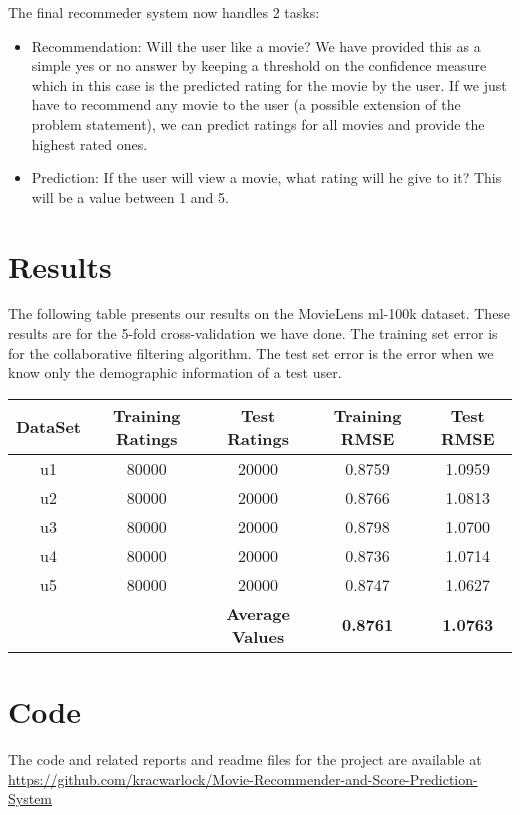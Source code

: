 \documentclass[pdftex,12pt,a4paper]{article}
\begin{document}
		The final recommeder system now handles 2 tasks:
		\begin{itemize}
			\item Recommendation: Will the user like a movie? We have provided this as a simple yes or no answer by keeping a threshold on the confidence measure which in this case is the predicted rating for the movie by the user. If we just have to recommend any movie to the user (a possible extension of the problem statement), we can predict ratings for all movies and provide the highest rated ones.
			\item Prediction: If the user will view a movie, what rating will he give to it? This will be a value between 1 and 5.
		\end{itemize}

	\section{Results}
		The following table presents our results on the MovieLens ml-100k dataset. These results are for the 5-fold cross-validation we have done. The training set error is for the collaborative filtering algorithm. The test set error is the error when we know only the demographic information of a test user.
		\begin{center}
			\begin{tabular}{|c|c|c|c|c|}
				\hline
				DataSet & Training Ratings & Test Ratings & Training RMSE & Test RMSE\\\hline
				u1 & 80000 & 20000 & 0.8759 & 1.0959\\
				u2 & 80000 & 20000 & 0.8766 & 1.0813\\
				u3 & 80000 & 20000 & 0.8798 & 1.0700\\
				u4 & 80000 & 20000 & 0.8736 & 1.0714\\
				u5 & 80000 & 20000 & 0.8747 & 1.0627\\\hline
				 & & \textbf{Average Values} & \textbf{0.8761} & \textbf{1.0763}\\
				\hline
			\end{tabular}
		\end{center}
		
	\section{Code}
		The code and related reports and readme files for the project are available at \url{https://github.com/kracwarlock/Movie-Recommender-and-Score-Prediction-System}

	
	
\end{document}
